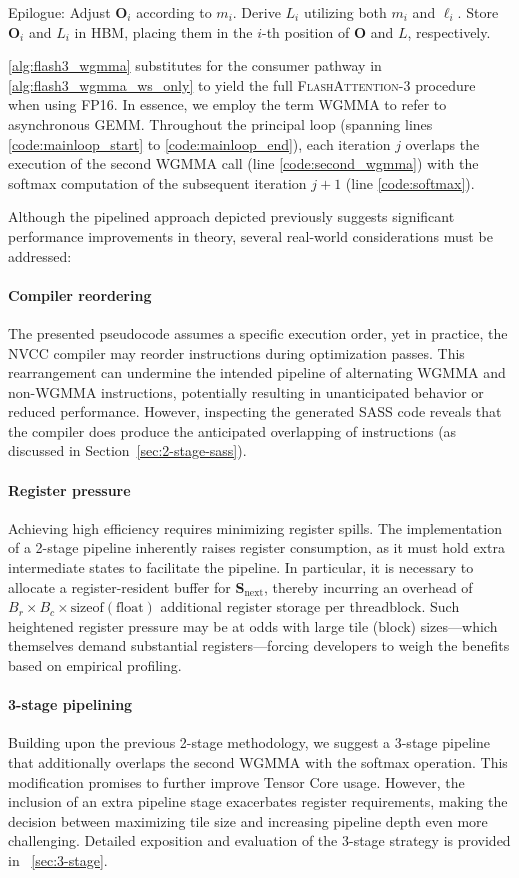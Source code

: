 \begin{algorithm}[H]
\begin{algorithmic}[1]
\STATE Epilogue: Adjust $\mathbf{O}_{i}$ according to $m_{i}$. Derive $L_{i}$ utilizing both $m_{i}$ and $\ell_{i}$.  
Store $\mathbf{O}_{i}$ and $L_{i}$ in HBM, placing them in the $i$-th position of $\mathbf{O}$ and $L$, respectively.

\cref{alg:flash3_wgmma} substitutes for the consumer pathway in \cref{alg:flash3_wgmma_ws_only} to yield the full \textsc{FlashAttention-3} procedure when using FP16. In essence, we employ the term WGMMA to refer to asynchronous GEMM. Throughout the principal loop (spanning lines \ref{code:mainloop_start} to \ref{code:mainloop_end}), each iteration $j$ overlaps the execution of the second WGMMA call (line \ref{code:second_wgmma}) with the softmax computation of the subsequent iteration $j+1$ (line \ref{code:softmax}).

Although the pipelined approach depicted previously suggests significant performance improvements in theory, several real-world considerations must be addressed:
\paragraph{Compiler reordering} The presented pseudocode assumes a specific execution order, yet in practice, the NVCC compiler may reorder instructions during optimization passes. This rearrangement can undermine the intended pipeline of alternating WGMMA and non-WGMMA instructions, potentially resulting in unanticipated behavior or reduced performance. However, inspecting the generated SASS code reveals that the compiler does produce the anticipated overlapping of instructions (as discussed in Section~\ref{sec:2-stage-sass}).
\paragraph{Register pressure} Achieving high efficiency requires minimizing register spills. The implementation of a 2-stage pipeline inherently raises register consumption, as it must hold extra intermediate states to facilitate the pipeline. In particular, it is necessary to allocate a register-resident buffer for $\mathbf{S}_{\mathrm{next}}$, thereby incurring an overhead of $B_r \times B_c \times \text{sizeof}(\text{float})$ additional register storage per threadblock. Such heightened register pressure may be at odds with large tile (block) sizes—which themselves demand substantial registers—forcing developers to weigh the benefits based on empirical profiling.
\paragraph{3-stage pipelining} Building upon the previous 2-stage methodology, we suggest a 3-stage pipeline that additionally overlaps the second WGMMA with the softmax operation. This modification promises to further improve Tensor Core usage. However, the inclusion of an extra pipeline stage exacerbates register requirements, making the decision between maximizing tile size and increasing pipeline depth even more challenging. Detailed exposition and evaluation of the 3-stage strategy is provided in ~\cref{sec:3-stage}.


\end{algorithmic}
\end{algorithm}
